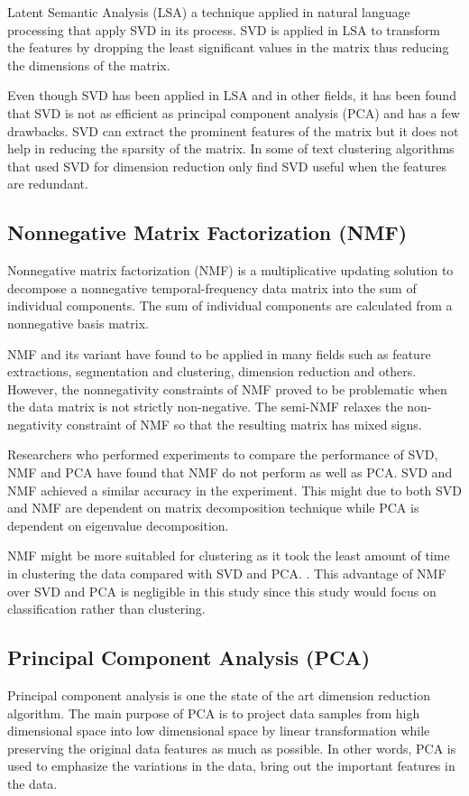 Latent Semantic Analysis (LSA) a technique applied in natural language processing that apply SVD in its process. SVD is applied in LSA to transform the features by dropping the least significant values in the matrix thus reducing the dimensions of the matrix. \cite{fuzzyLash}
	
Even though SVD has been applied in LSA and in other fields, it has been found that SVD is not as efficient as principal component analysis (PCA) and has a few drawbacks. SVD can extract the prominent features of the matrix but it does not help in reducing the sparsity of the matrix. 	In some of text clustering algorithms that used SVD for dimension reduction only find SVD useful when the features are redundant. \cite{lingo}
		
\subsection{Nonnegative Matrix Factorization (NMF)}
Nonnegative matrix factorization (NMF) is a multiplicative updating solution to decompose a nonnegative temporal-frequency data matrix into the sum of individual components. The sum of individual components are calculated from a nonnegative basis matrix. \cite{nmfBook}
	
NMF and its variant have found to be applied in many fields such as feature extractions, segmentation and clustering, dimension reduction and others. However, the nonnegativity constraints of NMF proved to be problematic when the data matrix is not strictly non-negative. The semi-NMF relaxes the non-negativity constraint of NMF so that the resulting matrix has mixed signs. \cite{semiNmfPca}
	
Researchers who performed experiments to compare the performance of SVD, NMF and PCA have found that NMF do not perform as well as PCA. SVD and NMF achieved a similar accuracy in the experiment. This might due to both SVD and NMF are dependent on matrix decomposition technique while PCA is dependent on eigenvalue decomposition. \cite{dimReducArabic}
	
NMF might be more suitabled for clustering as it took the least amount of time in clustering the data compared with SVD and PCA. \cite{dimReducArabic}. This advantage of NMF over SVD and PCA is negligible in this study since this study would focus on classification rather than clustering.
	
\subsection{Principal Component Analysis (PCA)}
Principal component analysis is one the state of the art dimension reduction algorithm. The main purpose of PCA is to project data samples from high dimensional space into low dimensional space by linear transformation while preserving the original data features as much as possible. \cite{pcaImage} In other words, PCA is used to emphasize the variations in the data, bring out the important features in the data.
	
